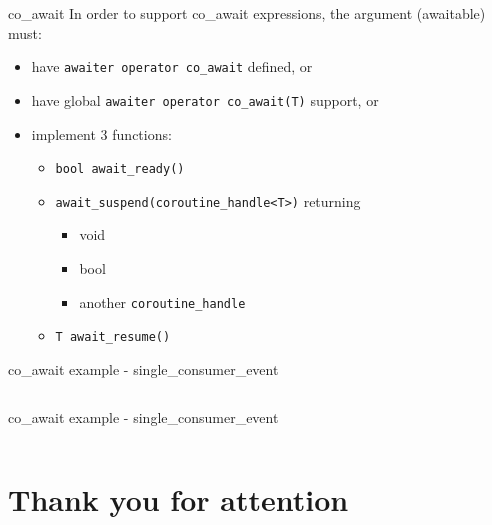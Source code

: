 \documentclass[10pt]{beamer}
\begin{document}
\begin{frame}{co\_await}
	In order to support co\_await expressions, the argument (awaitable) must:
	\begin{itemize}
		\item have \texttt{awaiter operator co\_await} defined, or
		\item have global \texttt{awaiter operator co\_await(T)} support, or
		\item implement 3 functions:
		\begin{itemize}
			\item \texttt{bool await\_ready()}
			\item \texttt{await\_suspend(coroutine\_handle<T>)} returning
			\begin{itemize}
				\item void 
				\item bool
				\item another \texttt{coroutine\_handle}
			\end{itemize}
			\item \texttt{T await\_resume()}
		\end{itemize}
	\end{itemize}
\end{frame}

\begin{frame}{co\_await example - single\_consumer\_event}
	\inputminted[lastline=20, fontsize=\scriptsize]{c++}{code-examples/cppcoro/single_consumer_event.hpp}
\end{frame}

\begin{frame}{co\_await example - single\_consumer\_event}
	\inputminted[firstline=22, fontsize=\scriptsize]{c++}{code-examples/cppcoro/single_consumer_event.hpp}
\end{frame}

\section*{Thank you for attention}
\end{document}
